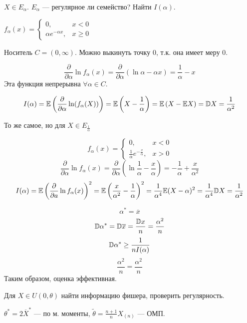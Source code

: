 \begin{exercise}
    \(X \in E_\alpha\). \(E_\alpha\) --- регулярное ли семейство? Найти \(I(\alpha)\).
\end{exercise}
\begin{solution}
    \(f_\alpha(x) = \begin{cases}
        0,                      & x < 0    \\
        \alpha e^{ -\alpha x} , & x \geq 0
    \end{cases}\)

    Носитель \(C = (0, \infty)\). Можно выкинуть точку \(0\), т.к. она имеет меру \(0\).

    \[\frac{\partial}{\partial \alpha} \ln f_\alpha(x) = \frac{\partial}{\partial \alpha} (\ln \alpha - \alpha x) = \frac{1}{\alpha} - x\]
    Эта функция непрерывна \(\forall \alpha \in C\).

    \[I(\alpha) = \mathbb{E}\left( \frac{\partial}{\partial \alpha} \ln(f_\alpha(X)) \right) = \mathbb{E} \left(X - \frac{1}{\alpha}\right) = \mathbb{E}\left(X - \mathbb{E} X\right) = \mathbb{D} X = \frac{1}{\alpha^2}\]
\end{solution}

\begin{exercise}
    То же самое, но для \(X \in E_{\frac{1}{\alpha}}\)
\end{exercise}
\begin{solution}
    \[f_\alpha(x) = \begin{cases}
            0,                                       & x < 0 \\
            \frac{1}{\alpha} e^{ -\frac{x}{\alpha}}, & x > 0
        \end{cases}\]
    \[\frac{\partial}{\partial \alpha} \ln f_\alpha(x) = \frac{\partial}{\partial \alpha} \left(\ln\frac{1}{\alpha} - \frac{x}{\alpha}\right) = - \frac{1}{\alpha} + \frac{x}{\alpha^2}\]
    \[I(\alpha) = \mathbb{E}\left(\frac{\partial}{\partial a} \ln f_\alpha(x)\right)^2 = \mathbb{E}\left(\frac{x}{\alpha^2} - \frac{1}{\alpha}\right)^2 = \frac{1}{\alpha^4} \mathbb{E}(X - \alpha)^2 = \frac{1}{\alpha^4} \mathbb{D} X = \frac{1}{\alpha^2}\]

    \[\alpha^* = \overline{x}\]
    \[\mathbb{D} \alpha^* = \mathbb{D} \overline{x} = \frac{\mathbb{D} x}{n} = \frac{\alpha^2}{n}\]
    \[\mathbb{D} \alpha^* \geq \frac{1}{n I(\alpha)}\]
    \[\frac{\alpha^2}{n} = \frac{\alpha^2}{n}\]
    Таким образом, оценка эффективная.
\end{solution}

\begin{exercise}
    Для \(X \in U(0, \theta)\) найти информацию фишера, проверить регулярность.

    \(\theta^* = 2 \overline{X}^*\) --- по м. моменты, \(\tilde \theta = \frac{n + 1}{n} X_{(n)}\) --- ОМП.
\end{exercise}


